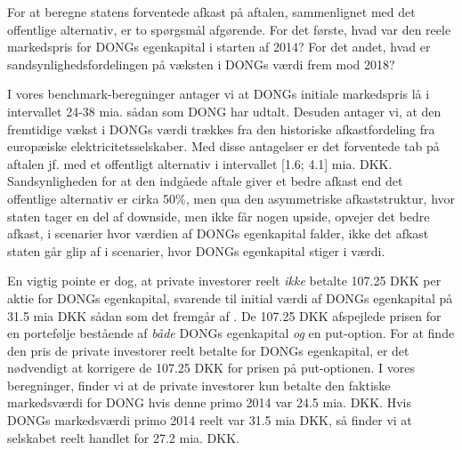 \documentclass{article}
\begin{document}
For at beregne statens forventede afkast på aftalen, sammenlignet med det offentlige alternativ, er to spørgsmål afgørende. For det første, hvad var den reele markedspris for DONGs egenkapital i starten af 2014? For det andet, hvad er sandsynlighedsfordelingen på væksten i DONGs værdi frem mod 2018? 

I vores benchmark-beregninger antager vi at DONGs initiale markedspris lå i intervallet 24-38 mia. sådan som DONG har udtalt. Desuden antager vi, at den fremtidige vækst i DONGs værdi trækkes fra den historiske afkastfordeling fra europæiske elektricitetsselskaber. Med disse antagelser er det forventede tab på aftalen jf. med et offentligt alternativ i intervallet [1.6; 4.1] mia. DKK. Sandsynligheden for at den indgåede aftale giver et bedre afkast end det offentlige alternativ er cirka 50\%, men qua den asymmetriske afkaststruktur, hvor staten tager en del af downside, men ikke får nogen upside, opvejer det bedre afkast, i scenarier hvor værdien af DONGs egenkapital falder, ikke det afkast staten går glip af i  scenarier, hvor DONGs egenkapital stiger i værdi.


En vigtig pointe er dog, at private investorer reelt \emph{ikke} betalte 107.25 DKK per aktie for DONGs egenkapital, svarende til initial værdi af DONGs egenkapital på 31.5 mia DKK sådan som det fremgår af \cite{FM2013a}. De 107.25 DKK afspejlede prisen for en portefølje bestående af \emph{både} DONGs egenkapital \emph{og} en put-option. For at finde den pris de private investorer reelt betalte for DONGs egenkapital, er det nødvendigt at korrigere de 107.25 DKK for prisen på put-optionen. I vores beregninger, finder vi at de private investorer kun betalte den faktiske markedsværdi for DONG hvis denne primo 2014 var 24.5 mia. DKK. Hvis DONGs markedsværdi primo 2014 reelt var 31.5 mia DKK, så finder vi at selskabet reelt handlet for 27.2 mia. DKK.
\end{document}
